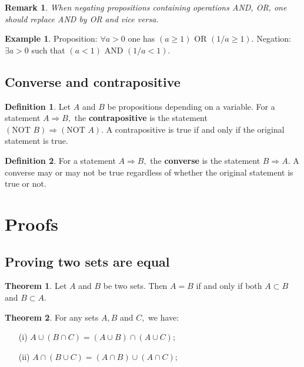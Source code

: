 \documentclass[12pt, a4paper]{article}
\newcommand{\imply}{\Rightarrow}
\newtheorem*{remark}{Remark}
\theoremstyle{definition}
\newtheorem{definition}{Definition}[section]
\newtheorem{theorem}{Theorem}[section]
\newtheorem*{example}{Example}
\theoremstyle{plain}
\begin{document}
\begin{remark}
When negating propositions containing operations AND, OR, one should replace AND by OR and vice versa.
\end{remark}

\begin{example}
Proposition: $\forall a>0$ one has $(a\geq 1)$ OR $(1/a\geq 1).$
Negation: $\exists a>0$ such that $(a<1)$ AND $(1/a <1).$
\end{example}

\subsection{Converse and contrapositive}

\begin{definition}
Let $A$ and $B$ be propositions depending on a variable. For a statement $A \imply B,$ the \textbf{contrapositive} is the statement $(\text{NOT } B) \imply (\text{NOT } A).$ A contrapositive is true if and only if the original statement is true.
\end{definition}

\begin{definition}
For a statement $A \imply B,$ the \textbf{converse} is the statement $B \imply A.$ A converse may or may not be true regardless of whether the original statement is true or not.
\end{definition}

\section{Proofs}

\subsection{Proving two sets are equal}

\begin{theorem}
Let $A$ and $B$ be two sets. Then $A=B$ if and only if both $A \subset B$ and $B \subset A.$
\end{theorem}

\begin{theorem}
For any sets $A,B$ and $C,$ we have: 
\begin{enumerate}

	\item[(i)] $A\cup(B\cap C)= (A\cup B)\cap (A\cup C);$

	\item[(ii)]$A\cap(B\cup C)= (A\cap B)\cup (A\cap C);$

\end{enumerate}
\end{theorem}
\end{document}
